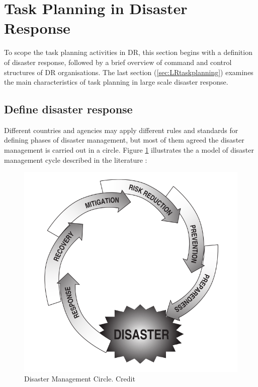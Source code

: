 \section{Task Planning in Disaster Response}\label{sec:lrplanning}
To scope the task planning activities in \ac{DR}, this section begins with a definition of disaster response, followed by a brief overview of command and control structures of \ac{DR} organisations. The last section (\ref{sec:LRtaskplanning}) examines the main characteristics of task planning in large scale disaster response.\\

\subsection{Define disaster response}
Different countries and agencies may apply different rules and standards for defining phases of disaster management, but most of them agreed the disaster management is carried out in a circle. Figure \ref{fig:drCircle} illustrates the a model of disaster management cycle described in the literature \cite{Wattegama2012} :\\

\begin{figure}[h]
  \centering
  \includegraphics[width=1\textwidth]{img/Background/drCircle}
  \caption{Disaster Management Circle. Credit \cite{Wattegama2012}}
  \label{fig:drCircle}
\end{figure}

